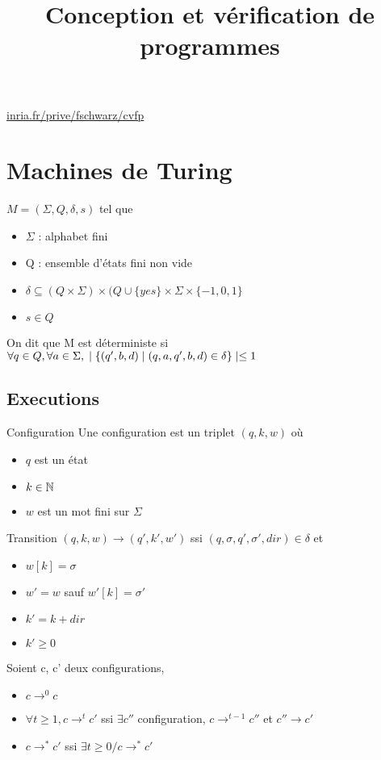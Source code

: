 \documentclass[10pt,a4paper]{article}
\title{Conception et vérification de programmes}
\newcommand{\ssi}{$ ssi $}
\begin{document}
\url{inria.fr/prive/fschwarz/cvfp}


\section{Machines de Turing}

\begin{definition} $M = ( \Sigma , Q , \delta, s)$ tel que \begin{itemize}
\item $\Sigma$ : alphabet fini
\item Q : ensemble d'états fini non vide
\item $\delta \subseteq (Q \times \Sigma) \times (Q \cup \{yes \} \times \Sigma \times \{-1, 0, 1\}$
\item $s \in Q$
\end{itemize}
On dit que M est déterministe si $\forall q \in Q, \forall a \in \Sigma,\\
 \mid \{ (q', b, d) \mid (q, a, q', b, d) \in \delta \} \mid \leq 1$
\end{definition}

\subsection{Executions}
\begin{definition}{Configuration}
Une configuration est un triplet $(q, k, w)$ où \begin{itemize}
\item $q$ est un état
\item $k \in \mathbb{N}$
\item $w$ est un mot fini sur $\Sigma$
\end{itemize}
\end{definition}

\begin{definition}{Transition}
$(q, k, w) \rightarrow (q', k', w')$ ssi $(q, \sigma, q', \sigma', dir) \in \delta$ et \begin{itemize}
\item $w[k] = \sigma$
\item $w' = w$ sauf $w'[k] = \sigma'$
\item $k' = k + dir$
\item $k' \geq 0$
\end{itemize}\end{definition}

\begin{definition}{} Soient c, c' deux configurations, \begin{itemize}
\item $c \rightarrow^0 c$
\item $ \forall t \geq 1, c \rightarrow^t c' \ssi \exists c''$ configuration, $c \rightarrow^{t-1}c''$ et $c'' \rightarrow c'$
\item $c \rightarrow^* c'$ ssi $\exists t \geq 0 / c \rightarrow^* c'$
\end{itemize} \end{definition}
\end{document}
